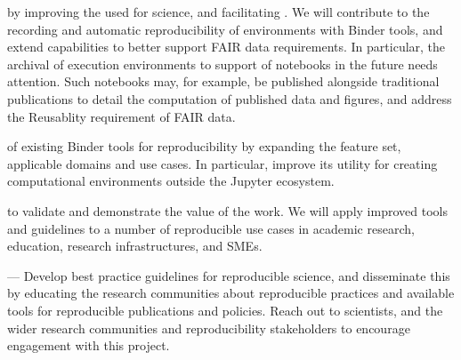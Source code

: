 \begin{compactenum}


\item \label{obj:reproducibility}  by
  improving the 
  used for science, and facilitating .
  We will contribute to the recording and automatic reproducibility
  of environments with Binder tools,
  and extend capabilities to better support FAIR
  data requirements. In particular, the archival of execution
  environments to support  of notebooks in the future
  needs attention. Such notebooks may, for example, be published alongside
  traditional publications to detail the computation of published data
  and figures, and address the Reusablity requirement of FAIR data.

\item \label{obj:broaden}  of existing Binder tools
    for reproducibility by expanding the feature set, applicable domains and use
    cases. In particular, improve its utility for creating computational environments
    outside the Jupyter ecosystem.

  \item \label{obj:demonstrators}  to validate and demonstrate the value of the work. We will apply
    improved tools and guidelines to a number of reproducible use cases in
    academic research, education, research infrastructures, and SMEs.

\item \label{obj:education}  --- Develop best
  practice guidelines for reproducible science, and disseminate this by
  educating the research communities about reproducible practices and available
  tools for reproducible publications and policies. Reach out to scientists, and
  the wider research communities and reproducibility stakeholders to encourage
  engagement with this project.



\end{compactenum}

